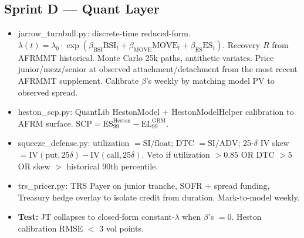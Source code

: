 \documentclass[11pt]{article}
\newcommand{\inlinecode}[1]{{\ttfamily\small #1}}
\begin{document}
\subsection{Sprint D --- Quant Layer}
\begin{itemize}
  \item \inlinecode{jarrow\_turnbull.py}: discrete-time reduced-form. $\lambda(t) = \lambda_0 \cdot \exp(\beta_{\mathrm{BSI}} \mathrm{BSI}_t + \beta_{\mathrm{MOVE}} \mathrm{MOVE}_t + \beta_{\mathrm{ES}} \mathrm{ES}_t)$. Recovery $R$ from AFRMMT historical. Monte Carlo 25k paths, antithetic variates. Price junior/mezz/senior at observed attachment/detachment from the most recent AFRMMT supplement. Calibrate $\beta$'s weekly by matching model PV to observed spread.
  \item \inlinecode{heston\_scp.py}: QuantLib \inlinecode{HestonModel} + \inlinecode{HestonModelHelper} calibration to AFRM surface. $\mathrm{SCP} = \mathrm{ES}_{99}^{\mathrm{Heston}} - \mathrm{EL}_{99}^{\mathrm{GBM}}$.
  \item \inlinecode{squeeze\_defense.py}: utilization $= \mathrm{SI} / \mathrm{float}$; DTC $= \mathrm{SI} / \mathrm{ADV}$; 25-$\delta$ IV skew $= \mathrm{IV}(\text{put}, 25\delta) - \mathrm{IV}(\text{call}, 25\delta)$. Veto if utilization $> 0.85$ OR DTC $> 5$ OR skew $>$ historical 90th percentile.
  \item \inlinecode{trs\_pricer.py}: TRS Payer on junior tranche, SOFR + spread funding, Treasury hedge overlay to isolate credit from duration. Mark-to-model weekly.
  \item \textbf{Test:} JT collapses to closed-form constant-$\lambda$ when $\beta$'s $= 0$. Heston calibration RMSE $<$ 3 vol points.
\end{itemize}
\end{document}
